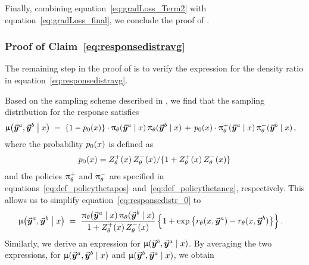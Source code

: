 	Finally, combining equation~\eqref{eq:gradLoss_Term2} with equation~\eqref{eq:gradLoss_final}, we conclude the proof of .
	
	
		
		\subsubsection{Proof of Claim~\eqref{eq:responsedistravg}}
		\label{sec:proof:thm:grad_3}
		
		The remaining step in the proof of  is to verify the expression for the density ratio in equation~\eqref{eq:responsedistravg}.
		
		Based on the sampling scheme described in , we find that the sampling distribution for the response satisfies
		\begin{align}
			\label{eq:responsedistr_0}
			\upmu \big( \vec{\boldsymbol{y}}\!\,^a, \vec{\boldsymbol{y}}\!\,^b \bigm| x \big)
			& \; = \; \{ 1 - p_0(x) \} \cdot \uppi_{\theta}(\vec{\boldsymbol{y}}\!\,^a \mid x) \,  \uppi_{\theta}(\vec{\boldsymbol{y}}\!\,^b \mid x)
			\, + \, p_0(x) \cdot \uppi_{\theta}^+(\vec{\boldsymbol{y}}\!\,^a \mid x) \,  \uppi_{\theta}^-(\vec{\boldsymbol{y}}\!\,^b \mid x) \, ,
		\end{align}
		where the probability $p_0(x)$ is defined as
		\begin{align*}
			p_0(x) = Z_{\theta}^+(x) \, Z_{\theta}^-(x) / \{1 + Z_{\theta}^+(x) \, Z_{\theta}^-(x) \}
		\end{align*}
		and the policies $\uppi_{\theta}^+$ and $\uppi_{\theta}^-$ are specified in equations~\eqref{eq:def_policythetapos}~and~\eqref{eq:def_policythetaneg}, respectively.
		This allows us to simplify equation~\eqref{eq:responsedistr_0} to
		\begin{align*}
			\upmu \big( \vec{\boldsymbol{y}}\!\,^a, \vec{\boldsymbol{y}}\!\,^b \bigm| x \big)
			& \; = \; \frac{\uppi_{\theta}(\vec{\boldsymbol{y}}\!\,^a \mid x) \, \uppi_{\theta}(\vec{\boldsymbol{y}}\!\,^b \mid x)}{1 + Z_{\theta}^+(x) \, Z_{\theta}^-(x)} \, \Big\{ 1 + \exp\big\{ r_{\theta}(x, \vec{\boldsymbol{y}}\!\,^a) - r_{\theta}(x, \vec{\boldsymbol{y}}\!\,^b) \big\} \Big\} \, .
		\end{align*}
		Similarly, we derive an expression for $\upmu ( \vec{\boldsymbol{y}}\!\,^b, \vec{\boldsymbol{y}}\!\,^a \mid x )$.
		By averaging the two expressions, for $\upmu ( \vec{\boldsymbol{y}}\!\,^a, \vec{\boldsymbol{y}}\!\,^b \mid x )$ and $\upmu ( \vec{\boldsymbol{y}}\!\,^b, \vec{\boldsymbol{y}}\!\,^a \mid x )$, we obtain
